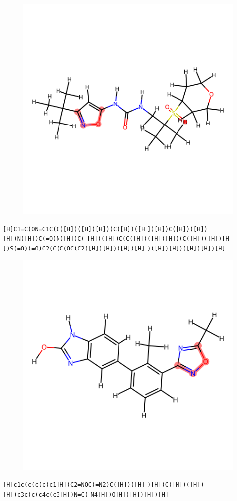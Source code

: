 \documentclass{article}
\begin{document}
\begin{figure}[ht]
\centering
    \includegraphics{mol230.png}
\end{figure}
\verb|[H]C1=C(ON=C1C(C([H])([H])[H])(C([H])([H| \verb|])[H])C([H])([H])[H])N([H])C(=O)N([H])C(| \verb|[H])([H])C(C([H])([H])[H])(C([H])([H])[H| \verb|])S(=O)(=O)C2(C(C(OC(C2([H])[H])([H])[H]| \verb|)([H])[H])([H])[H])[H]|

\begin{figure}[ht]
\centering
    \includegraphics{mol231.png}
\end{figure}
\verb|[H]c1c(c(c(c(c1[H])C2=NOC(=N2)C([H])([H]| \verb|)[H])C([H])([H])[H])c3c(c(c4c(c3[H])N=C(| \verb|N4[H])O[H])[H])[H])[H]|
\end{document}
